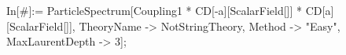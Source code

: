 In[\#]:= ParticleSpectrum[Coupling1 * CD[-a][ScalarField[]] * CD[a][ScalarField[]], TheoryName -> NotStringTheory, Method -> "Easy", MaxLaurentDepth -> 3]; 